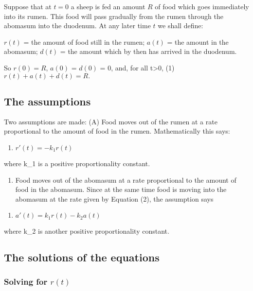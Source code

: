 \documentclass[]{article}
\providecommand{\tightlist}{%
  \setlength{\itemsep}{0pt}\setlength{\parskip}{0pt}}
\begin{document}
Suppose that at \(t = 0\) a sheep is fed an amount \(R\) of food which
goes immediately into its rumen. This food will pass gradually from the
rumen through the abomasum into the duodenum. At any later time \(t\) we
shall define:

\(r(t)\) = the amount of food still in the rumen; \(a(t)\) = the amount
in the abomasum; \(d(t)\) = the amount which by then has arrived in the
duodenum.

So \(r(0) = R\), \(a(0)\) = \(d(0)\) = 0, and, for all t\textgreater{}0,
(1) \(r(t) + a(t) + d(t) = R.\)

\subsection{The assumptions}\label{the-assumptions}

Two assumptions are made: (A) Food moves out of the rumen at a rate
proportional to the amount of food in the rumen. Mathematically this
says:

\begin{enumerate}
\def\labelenumi{(\arabic{enumi})}
\setcounter{enumi}{1}
\tightlist
\item
  \(r'(t) = -k_1r(t)\)
\end{enumerate}

where k\_1 is a positive proportionality constant.

\begin{enumerate}
\def\labelenumi{(\Alph{enumi})}
\setcounter{enumi}{1}
\tightlist
\item
  Food moves out of the abomasum at a rate proportional to the amount of
  food in the abomasum. Since at the same time food is moving into the
  abomasum at the rate given by Equation (2), the assumption says
\end{enumerate}

\begin{enumerate}
\def\labelenumi{(\arabic{enumi})}
\setcounter{enumi}{2}
\tightlist
\item
  \(a'(t) = k_1r(t)-k_2a(t)\)
\end{enumerate}

where k\_2 is another positive proportionality constant.

\subsection{The solutions of the
equations}\label{the-solutions-of-the-equations}

\subsubsection{\texorpdfstring{Solving for
\(r(t)\)}{Solving for r(t)}}\label{solving-for-rt}
\end{document}
